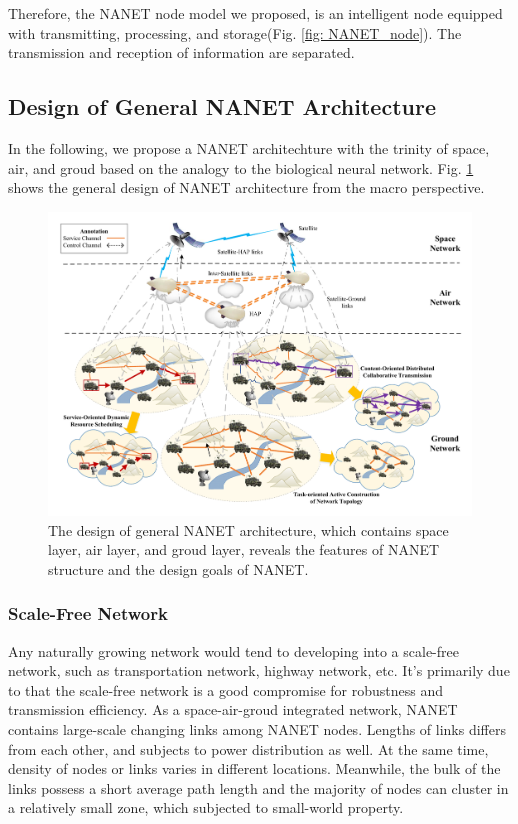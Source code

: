 \documentclass[journal,comsoc]{IEEEtran}
\begin{document}
				Therefore, the NANET node model we proposed, is an intelligent node equipped with transmitting, processing, and storage(Fig. \ref{fig: NANET_node}).
				The transmission and reception of information are separated.
	
		\subsection{Design of General NANET Architecture}
			
			In the following, we propose a NANET architechture with the trinity of space, air, and groud based on the analogy to the biological neural network.
			Fig. \ref{fig: sys_frame} shows the general design of NANET architecture from the macro perspective.
			\begin{figure}[htbp]
				\centering
				\includegraphics[width=\linewidth]{figures/Net_Arc.pdf}
				\caption{The design of general NANET architecture, which contains space layer, air layer, and groud layer, reveals the features of NANET structure and the design goals of NANET.}	
				\label{fig: sys_frame}
			\end{figure}
			\subsubsection{Scale-Free Network}
				Any naturally growing network would tend to developing into a scale-free network, such as transportation network, highway network, etc. 
				It's primarily due to that the scale-free network is a good compromise for robustness and transmission efficiency.
				As a space-air-groud integrated network, NANET contains large-scale changing links among NANET nodes.
				Lengths of links differs from each other, and subjects to power distribution as well. 
				At the same time, density of nodes or links varies in different locations.
				Meanwhile, the bulk of the links possess a short average path length and the majority of nodes can cluster in a relatively small zone, which subjected to small-world property.
				
\end{document}
